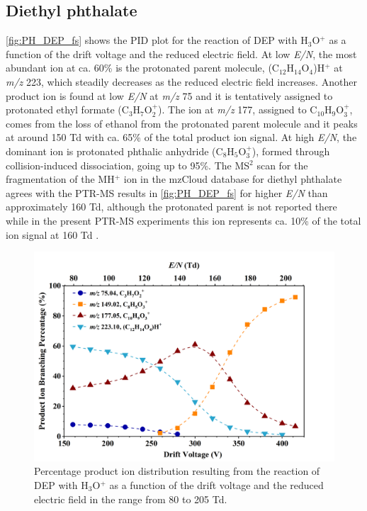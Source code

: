 \subsection{Diethyl phthalate}


\autoref{fig:PH_DEP_fs} shows the PID plot for the reaction of DEP with H$_3$O$^+$ as a function of the drift voltage and the reduced electric field.
At low \textit{E/N}, the most abundant ion at ca. 60\% is the protonated parent molecule, (C$_{12}$H$_{14}$O$_4$)H$^+$  at \textit{m/z} 223, which steadily decreases as the reduced electric field increases.
%
Another product ion is found at low \textit{E/N} at \textit{m/z} 75 and it is tentatively assigned to protonated ethyl formate (C$_3$H$_{7}$O$_2^+$).
The ion at \textit{m/z} 177, assigned to C$_{10}$H$_{9}$O$_3^+$, comes from the loss of ethanol from the protonated parent molecule and it peaks at around 150 Td with ca. 65\% of the total product ion signal.
At high \textit{E/N}, the dominant ion is protonated phthalic anhydride (C$_8$H$_{5}$O$_3^+$), formed through collision-induced dissociation, going up to 95\%. %
%
The MS$^2$ scan for the fragmentation of the MH$^+$ ion in the mzCloud database for diethyl phthalate agrees with the PTR-MS results in \autoref{fig:PH_DEP_fs} for higher \textit{E/N} than approximately 160 Td, although the protonated parent is not reported there while in the present PTR-MS experiments this ion represents ca. 10\% of the total ion signal at 160 Td
\cite{mzcloudDEP}.


\begin{figure}[htb]%
\centering
\includegraphics[height=0.4\textheight]{pics/DEP-BR.png}
\caption{Percentage product ion distribution resulting from the reaction of DEP with H$_3$O$^+$ as a function of the drift voltage and the reduced electric field in the range from 80 to 205 Td.}
\label{fig:PH_DEP_fs}
\end{figure}


